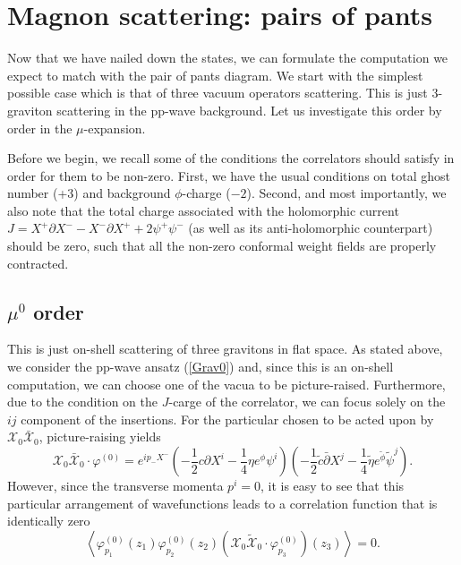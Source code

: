 \documentclass[12pt]{article}
\numberwithin{equation}{section}
\newcommand{\WT}[1]{\widetilde{#1}}
\newcommand{\B}[1]{\bar{#1}}
\begin{document}
\section{Magnon scattering: pairs of pants}
Now that we have nailed down the states, we can formulate the computation we expect to match with the pair of pants diagram. We start with the simplest possible case which is that of three vacuum operators scattering. This is just 3-graviton scattering in the pp-wave background. Let us investigate this order by order in the $\mu$-expansion.

Before we begin, we recall some of the conditions the correlators should satisfy in order for them to be non-zero. First, we have the usual conditions on total ghost number (+3) and background $\phi$-charge ($-2$). Second, and most importantly, we also note that the total charge associated with the holomorphic current $J=X^+\partial X^--X^-\partial X^++2\psi^+\psi^-$ (as well as its anti-holomorphic counterpart) should be zero, such that all the non-zero conformal weight fields are properly contracted.

\subsection{$\mu^0$ order}
This is just on-shell scattering of three gravitons in flat space. As stated above, we consider the pp-wave ansatz (\ref{Grav0}) and, since this is an on-shell computation, we can choose one of the vacua to be picture-raised. Furthermore, due to the condition on the $J$-carge of the correlator, we can focus solely on the $ij$ component of the insertions. For the particular chosen to be acted upon by $\mathcal{X}_0\B{\mathcal{X}}_0$, picture-raising yields
\begin{equation}
    \mathcal{X}_0\B{\mathcal{X}}_0\cdot\varphi^{(0)}=e^{ip_-X^-}\left(-\frac{1}{2}c\partial X^i-\frac{1}{4}\eta e^{\phi}\psi^i\right)\left(-\frac{1}{2}\WT{c}\B{\partial}X^j-\frac{1}{4}\WT{\eta}e^{\WT{\phi}}\WT{\psi}^j\right).
\end{equation}
However, since the transverse momenta $p^i=0$, it is easy to see that this particular arrangement of wavefunctions leads to a correlation function that is identically zero
\begin{equation}
    \left\langle\varphi_{p_1}^{(0)}(z_1)\varphi_{p_2}^{(0)}(z_2)\left(\mathcal{X}_0\WT{\mathcal{X}}_0\cdot\varphi_{p_3}^{(0)}\right)(z_3)\right\rangle=0.
\end{equation}
\end{document}
